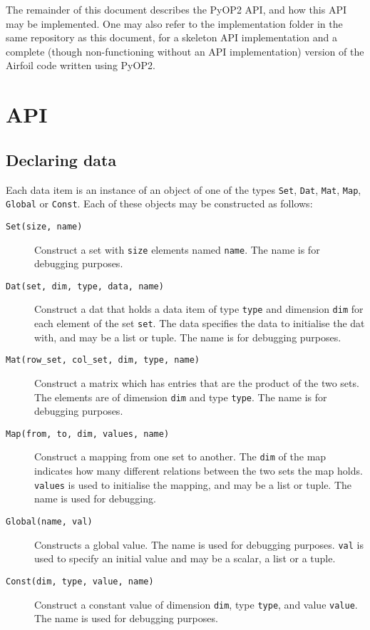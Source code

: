 \documentclass[a4paper]{article}
\begin{document}
The remainder of this document describes the PyOP2 API, and how this API may be implemented. One may also refer to the implementation folder in the same repository as this document, for a skeleton API implementation and a complete (though non-functioning without an API implementation) version of the Airfoil code written using PyOP2.

\section{API}

\subsection{Declaring data}

Each data item is an instance of an object of one of the types \verb|Set|, \verb|Dat|, \verb|Mat|, \verb|Map|, \verb|Global| or \verb|Const|. Each of these objects may be constructed as follows:

\begin{description}
  \item[\texttt{Set(size, name)}] Construct a set with \verb|size| elements named \verb|name|. The name is for debugging purposes.
  \item[\texttt{Dat(set, dim, type, data, name)}] Construct a dat that holds a data item of type \verb|type| and dimension \verb|dim| for each element of the set \verb|set|. The data specifies the data to initialise the dat with, and may be a list or tuple. The name is for debugging purposes.
  \item[\texttt{Mat(row\_set, col\_set, dim, type, name)}] Construct a matrix which has entries that are the product of the two sets. The elements are of dimension \verb|dim| and type \verb|type|. The name is for debugging purposes.
  \item[\texttt{Map(from, to, dim, values, name)}] Construct a mapping from one set to another. The \verb|dim| of the map indicates how many different relations between the two sets the map holds. \verb|values| is used to initialise the mapping, and may be a list or tuple. The name is used for debugging.
  \item[\texttt{Global(name, val)}] Constructs a global value. The name is used for debugging purposes. \verb|val| is used to specify an initial value and may be a scalar, a list or a tuple.
  \item[\texttt{Const(dim, type, value, name)}] Construct a constant value of dimension \verb|dim|, type \verb|type|, and value \verb|value|. The name is used for debugging purposes.
\end{description}
\end{document}
